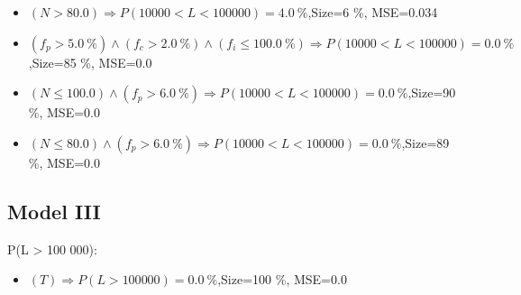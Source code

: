 \documentclass[numbered]{CSL}
\begin{document}
\begin{itemize}
\item $(N > 80.0) \Rightarrow P(10 000 < L < 100 000) = 4.0~\%$,\hfill Size=6 \%, MSE=0.034
\item $(f_p > 5.0~\%) \land (f_c > 2.0~\%) \land (f_i \leq 100.0~\%) \Rightarrow P(10 000 < L < 100 000) = 0.0~\%$,\hfill Size=85 \%, MSE=0.0
\item $(N \leq 100.0) \land (f_p > 6.0~\%) \Rightarrow P(10 000 < L < 100 000) = 0.0~\%$,\hfill Size=90 \%, MSE=0.0
\item $(N \leq 80.0) \land (f_p > 6.0~\%) \Rightarrow P(10 000 < L < 100 000) = 0.0~\%$,\hfill Size=89 \%, MSE=0.0
\end{itemize}

\subsection{Model III}
P(L > 100 000):
\begin{itemize}
\item $(T) \Rightarrow P(L > 100 000) = 0.0~\%$,\hfill Size=100 \%, MSE=0.0
\end{itemize}
\end{document}
